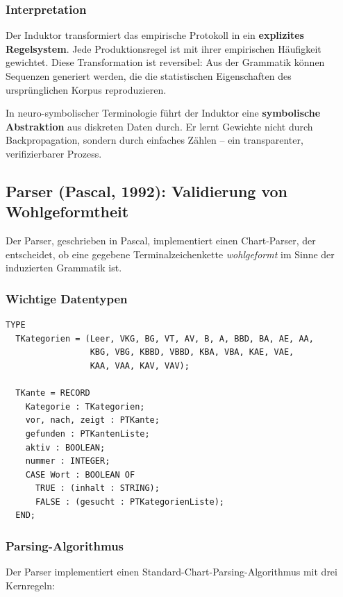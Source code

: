 \documentclass[12pt,a4paper]{article}
\begin{document}
\subsubsection{Interpretation}

Der Induktor transformiert das empirische Protokoll in ein \textbf{explizites 
Regelsystem}. Jede Produktionsregel ist mit ihrer empirischen Häufigkeit 
gewichtet. Diese Transformation ist reversibel: Aus der Grammatik können 
Sequenzen generiert werden, die die statistischen Eigenschaften des 
ursprünglichen Korpus reproduzieren.

In neuro-symbolischer Terminologie führt der Induktor eine \textbf{symbolische 
Abstraktion} aus diskreten Daten durch. Er lernt Gewichte nicht durch 
Backpropagation, sondern durch einfaches Zählen – ein transparenter, 
verifizierbarer Prozess.

\subsection{Parser (Pascal, 1992): Validierung von Wohlgeformtheit}

Der Parser, geschrieben in Pascal, implementiert einen Chart-Parser, der 
entscheidet, ob eine gegebene Terminalzeichenkette \textit{wohlgeformt} im 
Sinne der induzierten Grammatik ist.

\subsubsection{Wichtige Datentypen}

\begin{lstlisting}[caption=Parserdatenstrukturen in Pascal]
TYPE
  TKategorien = (Leer, VKG, BG, VT, AV, B, A, BBD, BA, AE, AA,
                 KBG, VBG, KBBD, VBBD, KBA, VBA, KAE, VAE,
                 KAA, VAA, KAV, VAV);
  
  TKante = RECORD
    Kategorie : TKategorien;
    vor, nach, zeigt : PTKante;
    gefunden : PTKantenListe;
    aktiv : BOOLEAN;
    nummer : INTEGER;
    CASE Wort : BOOLEAN OF
      TRUE : (inhalt : STRING);
      FALSE : (gesucht : PTKategorienListe);
  END;
\end{lstlisting}

\subsubsection{Parsing-Algorithmus}

Der Parser implementiert einen Standard-Chart-Parsing-Algorithmus mit drei 
Kernregeln:
\end{document}
